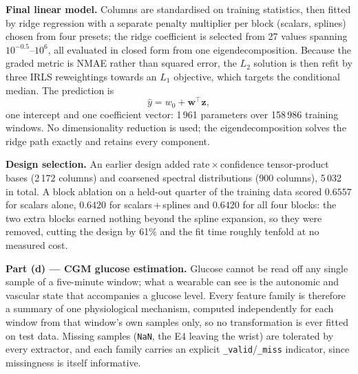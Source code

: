 \documentclass[10pt,a4paper]{article}
\newcommand{\feat}[1]{\texttt{\small #1}}
\begin{document}
\textbf{Final linear model.} Columns are standardised on training statistics, then fitted
by ridge regression with a separate penalty multiplier per block (scalars, splines) chosen
from four presets; the ridge coefficient is selected from 27 values spanning
$10^{-0.5}$--$10^{6}$, all evaluated in closed form from one eigendecomposition. Because
the graded metric is NMAE rather than squared error, the $L_2$ solution is then refit by
three IRLS reweightings towards an $L_1$ objective, which targets the conditional median.
The prediction is
\[
  \hat{y} = w_0 + \mathbf{w}^{\!\top}\mathbf{z},
\]
one intercept and one coefficient vector: 1\,961 parameters over 158\,986 training windows.
No dimensionality reduction is used; the eigendecomposition solves the ridge path exactly
and retains every component.

\textbf{Design selection.} An earlier design added rate\,$\times$\,confidence
tensor-product bases (2\,172 columns) and coarsened spectral distributions (900 columns),
5\,032 in total. A block ablation on a held-out quarter of the training data scored
$0.6557$ for scalars alone, $0.6420$ for scalars\,+\,splines and $0.6420$ for all four
blocks: the two extra blocks earned nothing beyond the spline expansion, so they were
removed, cutting the design by 61\% and the fit time roughly tenfold at no measured cost.


\textbf{Part (d) --- CGM glucose estimation.}
Glucose cannot be read off any single sample of a five-minute window; what a
wearable can see is the autonomic and vascular state that accompanies a glucose
level. Every feature family is therefore a summary of one physiological
mechanism, computed independently for each window from that window's own
samples only, so no transformation is ever fitted on test data. Missing samples
(\texttt{NaN}, the E4 leaving the wrist) are tolerated by every extractor, and
each family carries an explicit \feat{*\_valid}/\feat{*\_miss} indicator, since
missingness is itself informative.
\end{document}
